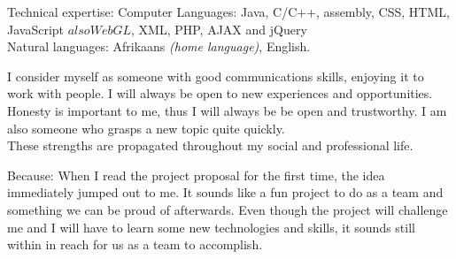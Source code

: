 \spacedhrule{-0.2em}{-0.4em}



\inlineheadsection  %
  {Technical expertise:}
  {Computer Languages: Java, C/C++, assembly, CSS, HTML, JavaScript \(also WebGL\), XML, PHP, AJAX and jQuery}\\

\vspace{0.5em}
\inlineheadsection
  {Natural languages:}
  {Afrikaans \emph{(home language)}, English.}


\spacedhrule{1.6em}{-0.4em}

  
\spacedhrule{1.6em}{-0.4em}  
  

\inlineheadsection
I consider myself as someone with good communications skills, enjoying it to work with people. I will always be open to new experiences and opportunities. Honesty is important to me, thus I will always be be open and trustworthy. I am also someone who grasps a new topic quite quickly. \\

These strengths are propagated throughout my social and professional life.
   
\spacedhrule{1.6em}{-0.4em}  
  

\inlineheadsection
  {Because:}
  {When I read the project proposal for the first time, the idea immediately jumped out to me. It sounds like a fun project to do as a team and something we can be proud of afterwards. Even though the project will challenge me and I will have to learn some new technologies and skills, it sounds still within in reach for us as a team to accomplish. }